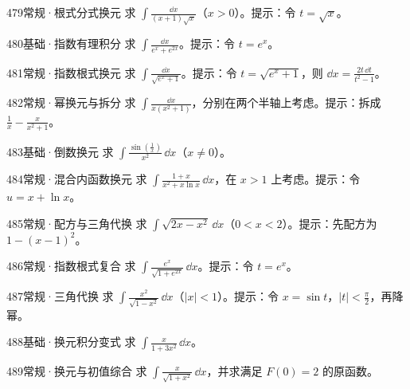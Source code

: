 \begin{exercise}{479}{常规·根式分式换元}
求 $\int\frac{\dd x}{(x+1)\sqrt x}$（$x>0$）。提示：令 $t=\sqrt x$。
\end{exercise}
\begin{exercise}{480}{基础·指数有理积分}
求 $\int\frac{\dd x}{e^x+e^{2x}}$。提示：令 $t=e^x$。
\end{exercise}
\begin{exercise}{481}{常规·指数根式换元}
求 $\int\frac{\dd x}{\sqrt{e^x+1}}$。提示：令 $t=\sqrt{e^x+1}$，则 $\dd x=\frac{2t\,\dd t}{t^2-1}$。
\end{exercise}
\begin{exercise}{482}{常规·幂换元与拆分}
求 $\int\frac{\dd x}{x(x^2+1)}$，分别在两个半轴上考虑。提示：拆成 $\frac{1}{x}-\frac{x}{x^2+1}$。
\end{exercise}
\begin{exercise}{483}{基础·倒数换元}
求 $\int\frac{\sin(\frac{1}{x})}{x^2}\,\dd x$（$x\ne0$）。
\end{exercise}
\begin{exercise}{484}{常规·混合内函数换元}
求 $\int\frac{1+x}{x^2+x\ln x}\,\dd x$，在 $x>1$ 上考虑。提示：令 $u=x+\ln x$。
\end{exercise}
\begin{exercise}{485}{常规·配方与三角代换}
求 $\int\sqrt{2x-x^2}\,\dd x$（$0<x<2$）。提示：先配方为 $1-(x-1)^2$。
\end{exercise}
\begin{exercise}{486}{常规·指数根式复合}
求 $\int\frac{e^x}{\sqrt{1+e^{2x}}}\,\dd x$。提示：令 $t=e^x$。
\end{exercise}
\begin{exercise}{487}{常规·三角代换}
求 $\int\frac{x^2}{\sqrt{1-x^2}}\,\dd x$（$|x|<1$）。提示：令 $x=\sin t$，$|t|<\frac{\pi}{2}$，再降幂。
\end{exercise}
\begin{exercise}{488}{基础·换元积分变式}
求 $\int\frac{x}{1+3x^2}\,\dd x$。
\end{exercise}
\begin{exercise}{489}{常规·换元与初值综合}
求 $\int\frac{x}{\sqrt{1+x^2}}\,\dd x$，并求满足 $F(0)=2$ 的原函数。
\end{exercise}
